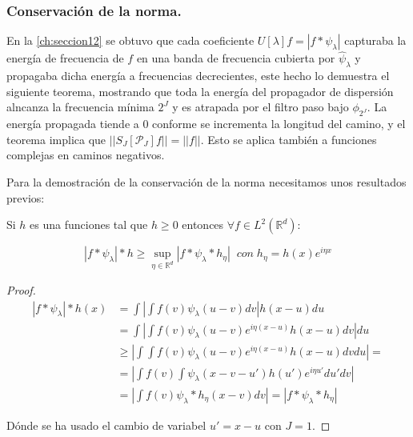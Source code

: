 \subsubsection{Conservación de la norma.}

En la \autoref{ch:seccion12} se obtuvo que cada coeficiente $U[\lambda]f=|f \ast \psi_\lambda|$ capturaba la energía de frecuencia de $f$ en una banda de frecuencia cubierta por $\widehat{\psi}_\lambda$ y propagaba dicha energía a frecuencias decrecientes, este hecho lo demuestra el siguiente teorema, mostrando que toda la energía del propagador de dispersión alncanza la frecuencia mínima $2^J$ y es atrapada por el filtro paso bajo $\phi_ {2^J}$. La energía propagada tiende a $0$ conforme se incrementa la longitud del camino, y el teorema implica que $||S_J[\mathcal{P}_J]f||=||f||$. Esto se aplica también a funciones complejas en caminos negativos.

\medskip

\noindent Para la demostración de la conservación de la norma necesitamos unos resultados previos: 

\begin{lema}
  Si $h$ es una funciones tal que $h\geq 0$ entonces $\forall f \in L^2(\mathbb{R}^d)$: 
  
  \begin{equation}
    |f \ast \psi_\lambda | \ast h \geq \sup_{\eta \in \mathbb{R}^d} |f\ast \psi_\lambda \ast h_\eta | \; \; con \; h_\eta=h(x)e^{i\eta x}
  \end{equation}
\end{lema}
  
\begin{proof}
  
  \begin{align*}
      |f \ast \psi_\lambda | \ast h (x) &= \int \left| \int f(v)\psi_\lambda(u-v)dv \right| h(x-u)du \\
      &=\int \left | \int f(v) \psi_\lambda(u-v) e^{i\eta(x-u)} h(x-u) dv \right| du \\
      &\geq \left | \int \int f(v) \psi_\lambda(u-v) e^{i\eta(x-u)} h(x-u) dv du \right| = \\
      &= \left | \int f(v) \int  \psi_\lambda(x-v-u')h(u') e^{i\eta u'}  du' dv \right| \\
      &= \left | \int f(v) \psi_\lambda \ast h_\eta(x-v) dv \right| = |f\ast \psi_\lambda \ast h_\eta|
  \end{align*}

  \noindent Dónde se ha usado el cambio de variabel $u'=x-u$ con $J=1$.
\end{proof}

